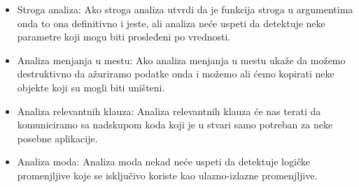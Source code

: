 \begin{itemize}
\item Stroga analiza:
Ako stroga analiza utvrdi da je funkcija stroga u argumentima onda to ona definitivno i jeste, ali analiza neće uspeti da detektuje neke parametre koji mogu biti prosleđeni po vrednosti. 

\item Analiza menjanja u mestu:
Ako analiza menjanja u mestu ukaže da možemo destruktivno da ažuriramo podatke onda i možemo ali ćemo kopirati neke objekte koji su mogli biti uništeni. \cite{Girard1987}

\item Analiza relevantnih klauza:
Analiza relevantnih klauza će nas terati da komuniciramo sa nadskupom koda koji je u stvari samo potreban za neke posebne aplikacije.  

\item Analiza moda:
Analiza moda nekad neće uspeti da detektuje logičke promenjljive koje se isključivo koriste kao ulazno-izlazne promenjljive. 

\end{itemize}
